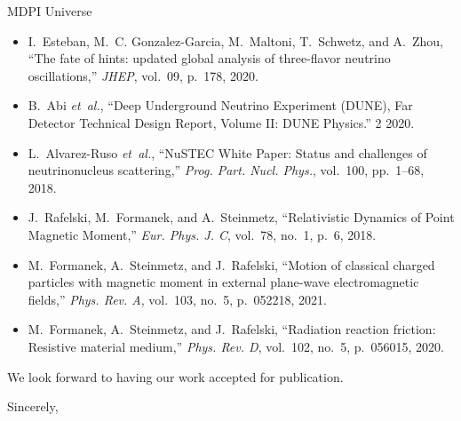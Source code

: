 \documentclass[a4paper, 10pt]{letter}
\begin{document}
\begin{letter}{MDPI Universe}
\begin{itemize}
    \item I.~Esteban, M.~C. Gonzalez-Garcia, M.~Maltoni, T.~Schwetz, and A.~Zhou, ``{The fate of hints: updated global analysis of three-flavor neutrino oscillations},'' {\em JHEP}, vol.~09, p.~178, 2020.
    \item B.~Abi {\em et~al.}, ``{Deep Underground Neutrino Experiment (DUNE), Far Detector Technical Design Report, Volume II: DUNE Physics}.'' 2 2020.
    \item L.~Alvarez-Ruso {\em et~al.}, ``{NuSTEC White Paper: Status and challenges of neutrino\textendash{}nucleus scattering},'' {\em Prog. Part. Nucl. Phys.}, vol.~100, pp.~1--68, 2018.
    \item J.~Rafelski, M.~Formanek, and A.~Steinmetz, ``{Relativistic Dynamics of Point Magnetic Moment},'' {\em Eur. Phys. J. C}, vol.~78, no.~1, p.~6, 2018.
    \item M.~Formanek, A.~Steinmetz, and J.~Rafelski, ``{Motion of classical charged particles with magnetic moment in external plane-wave electromagnetic fields},'' {\em Phys. Rev. A}, vol.~103, no.~5, p.~052218, 2021.
    \item M.~Formanek, A.~Steinmetz, and J.~Rafelski, ``{Radiation reaction friction: Resistive material medium},'' {\em Phys. Rev. D}, vol.~102, no.~5, p.~056015, 2020.
\end{itemize}

We look forward to having our work accepted for publication.

\closing{Sincerely,}

\end{letter}
\end{document}
